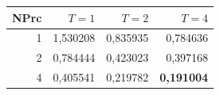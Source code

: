 \begin{tabular}{@{}rrrr@{}}
\toprule
NPrc & $T=1$ & $T=2$ & $T=4$ \\
\midrule
1 & 1{,}530208 & 0{,}835935 & 0{,}784636 \\
2 & 0{,}784444 & 0{,}423023 & 0{,}397168 \\
4 & 0{,}405541 & 0{,}219782 & \textbf{0{,}191004} \\
\bottomrule
\end{tabular}
